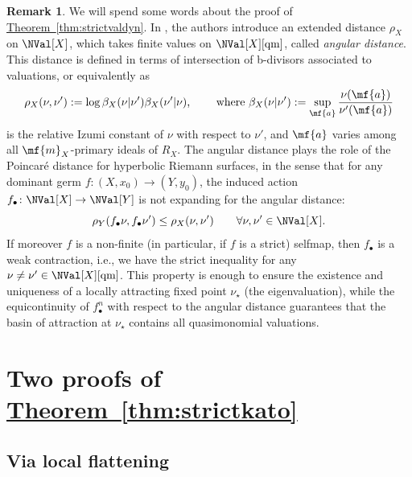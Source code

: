 \documentclass[11 pt, twoside, a4paper]{amsart}
\theoremstyle{definition}
\newtheorem{rem}[thm]{Remark}
\theoremstyle{definition}
\newcommand{\refthm}[1]{\hyperref[thm:#1]{Theorem~\ref*{thm:#1}}}
\begin{document}
\begin{rem}
We will spend some words about the proof of \refthm{strictvaldyn}. In \cite{gignac-ruggiero:locdynnoninvnormsurfsing}, the authors introduce an extended distance $\rho_X$ on $\NVal[X]$, which takes finite values on $\NVal[X][\mathrm{qm}]$, called \emph{angular distance}.
This distance is defined in terms of intersection of b-divisors associated to valuations, or equivalently as
$$
\rho_X(\nu,\nu'):=\log \beta_X(\nu|\nu') \beta_X (\nu'|\nu)\text{, \qquad where } 
\beta_X(\nu|\nu') := \sup_{\mf{a}} \frac{\nu(\mf{a})}{\nu'(\mf{a})}
$$
is the relative Izumi constant of $\nu$ with respect to $\nu'$, and $\mf{a}$ varies among all $\mf{m}_X$-primary ideals of $R_X$.
The angular distance plays the role of the Poincaré distance for hyperbolic Riemann surfaces, in the sense that for any dominant germ $f \colon (X,x_0) \to (Y,y_0)$, the induced action $f_\bullet \colon \NVal[X] \to \NVal[Y]$ is not expanding for the angular distance:
$$
\rho_Y(f_\bullet \nu, f_\bullet \nu') \leq \rho_X(\nu,\nu')\qquad \forall \nu, \nu' \in \NVal[X]\text{.}
$$
If moreover $f$ is a non-finite (in particular, if $f$ is a strict) selfmap, then $f_\bullet$ is a weak contraction, i.e., we have the strict inequality for any $\nu \neq \nu' \in \NVal[X][\mathrm{qm}]$.
This property is enough to ensure the existence and uniqueness of a locally attracting fixed point $\nu_\star$ (the eigenvaluation), while the equicontinuity of $f_\bullet^n$ with respect to the angular distance guarantees that the basin of attraction at $\nu_\star$ contains all quasimonomial valuations.
\end{rem}




\section{Two proofs of \refthm{strictkato}}\label{sec:proofstrictkato}

\subsection{Via local flattening}

\end{document}
